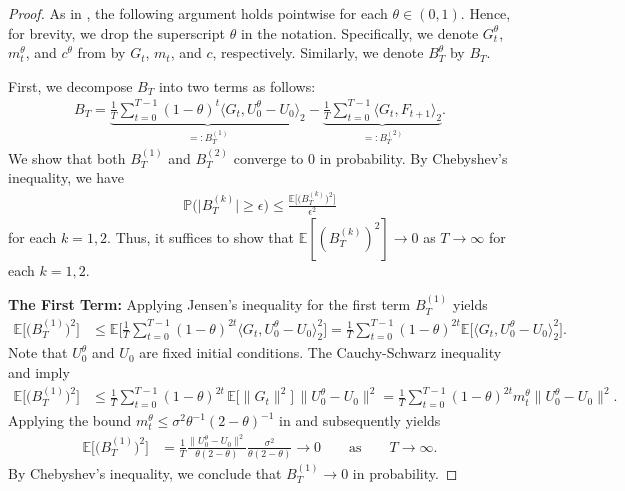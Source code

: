 \documentclass[a4paper, 11pt]{article}
\newcommand{\E}{\mathbb E}
\theoremstyle{definition}
\begin{document}
\begin{proof}
    As in , the following argument holds pointwise for each $\theta \in (0, 1)$.
	Hence, for brevity, we drop the superscript $\theta$ in the notation.
    Specifically, we denote $G_t^\theta$, $m_t^\theta$, and $c^\theta$ from  by $G_t$, $m_t$, and $c$, respectively.
    Similarly, we denote $B_T^\theta$ by $B_T$.
    
    First, we decompose $B_T$ into two terms as follows:
	\begin{align}
		B_T = \underbrace{ \frac{1}{T} \sum_{t=0}^{T-1} (1-\theta)^{t} \big\langle G_t, U_0^\theta - U_0 \big\rangle_2 }_{ =: B_T^{(1)} } - \underbrace{ \frac{1}{T} \sum_{t=0}^{T-1} \big\langle G_t, F_{t+1} \big\rangle_2 }_{ =: B_T^{(2)} } .
	\end{align}
    We show that both $B_T^{(1)}$ and $B_T^{(2)}$ converge to 0 in probability.
    By Chebyshev's inequality, we have
    \begin{align}
		\mathbb{P}\big( \big| B_T^{(k)} \big| \ge \epsilon \big) \le \frac{ \E\big[ \big( B_T^{(k)} \big)^2 \big] }{ \epsilon^2 }
	\end{align}
    for each $k = 1, 2$.
    Thus, it suffices to show that $\E[ ( B_T^{(k)} )^2 ] \to 0$ as $T \to \infty$ for each $k = 1, 2$.

    \vspace{5pt}
    \noindent
    \textbf{The First Term:}    
    Applying Jensen's inequality for the first term $B_T^{(1)}$ yields
    \begin{align}
		\E\big[ \big( B_T^{(1)} \big)^2 \big] & \le \E\bigg[ \frac{1}{T} \sum_{t=0}^{T-1} (1-\theta)^{2t} \langle G_t, U_0^\theta - U_0 \rangle_2^2 \bigg] = \frac{1}{T} \sum_{t=0}^{T-1} (1-\theta)^{2t} \E\big[ \langle G_t, U_0^\theta - U_0 \rangle_2^2 \big] .
    \end{align}
    Note that $U_0^\theta$ and $U_0$ are fixed initial conditions.
    The Cauchy-Schwarz inequality and  imply
    \begin{align}
        \E\big[ \big( B_T^{(1)} \big)^2 \big] & \le \frac{1}{T} \sum_{t=0}^{T-1} (1-\theta)^{2t} \, \E\big[ \|G_t\|^2 \big] \, \| U_0^\theta - U_0 \|^2 = \frac{1}{T} \sum_{t=0}^{T-1} (1-\theta)^{2t} m_t^\theta \| U_0^\theta - U_0 \|^2 .
    \end{align}
    Applying the bound $m_t^\theta \le \sigma^2 \theta^{-1} (2 - \theta)^{-1}$ in  and subsequently  yields
    \begin{align}
        \E\big[ \big( B_T^{(1)} \big)^2 \big] & = \frac{1}{T} \frac{\| U_0^\theta - U_0 \|^2}{\theta (2 - \theta)} \frac{\sigma^2}{\theta(2-\theta)} \longrightarrow 0 \qquad \text{as} \qquad T \to \infty .
	\end{align}
    By Chebyshev's inequality, we conclude that $B_T^{(1)} \to 0$ in probability.


\end{proof}
\end{document}
